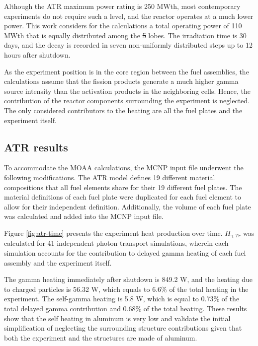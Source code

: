 \documentclass{style/nseJournal}
\providecommand{\DIFadd}[1]{{\protect\color{blue}\uwave{#1}}} %
\providecommand{\DIFdel}[1]{{\protect\color{red}\sout{#1}}}                      %
\providecommand{\DIFaddbegin}{} %
\providecommand{\DIFaddend}{} %
\providecommand{\DIFdelbegin}{} %
\providecommand{\DIFdelend}{} %
\begin{document}
Although the ATR maximum power rating is 250 MWth, most contemporary experiments do not require such a level, and the reactor operates at a much lower power.
This work considers for the calculations a total operating power of 110 MWth that is equally distributed among the \DIFdelbegin \DIFdel{5 }\DIFdelend \DIFaddbegin \DIFadd{five }\DIFaddend lobes.
The irradiation time is 30 days, and the decay is recorded in seven non-uniformly distributed steps up to 12 hours after shutdown.

As the experiment position is in the core region between the fuel assemblies, the calculations assume that the fission products generate a much higher gamma source intensity than the activation products in the neighboring cells.
Hence, the contribution of the reactor components surrounding the experiment is neglected.
The only considered contributors to the heating are all the fuel plates and the experiment itself.


\subsection{ATR results}

To accommodate the MOAA calculations, the MCNP input file underwent the following modifications.
The ATR model defines 19 different material compositions that all fuel elements share for their 19 different fuel plates.
The material definitions of each fuel plate were duplicated for each fuel element to allow for their independent definition.
Additionally, the volume of each fuel plate was calculated and added into the MCNP input file.

Figure \ref{fig:atr-time} presents the experiment heat production over time.
\DIFdelbegin \DIFdel{$H_{\gamma,Tr}$ }\DIFdelend \DIFaddbegin \DIFadd{$H_{\mathrm{\gamma, Tr}}$ }\DIFaddend was calculated for 41 independent photon-transport simulations, wherein each simulation accounts for the contribution to delayed gamma heating of each fuel assembly and the experiment itself.

The gamma heating immediately after shutdown is 849.2 W, and the heating due to charged particles is 56.32 W, which equals to 6.6\% of the total heating in the experiment.
The self-gamma heating is 5.8 W, which is equal to 0.73\% of the total delayed gamma contribution and 0.68\% of the total heating.
These results show that the self heating in aluminum is very low and validate the initial simplification of neglecting the surrounding structure contributions given that both the experiment and the structures are made of aluminum.
\end{document}
